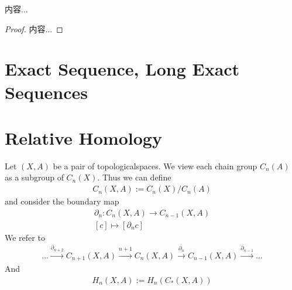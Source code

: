 \documentclass[Total.tex]{subfiles}
\begin{document}
			\begin{corollary}
				内容...
			\end{corollary}
			\begin{proof}
				内容...
			\end{proof}
		\section{Exact Sequence, Long Exact Sequences}
			
		\section{Relative Homology}
			\begin{Def}
				Let $(X,A)$ be a pair of topologicalspaces. We view each chain group $C_n(A)$ as a subgroup of $C_n(X)$. Thus we can define
				\begin{gather*}
					C_n(X,A):=C_n(X)/C_n(A)
				\end{gather*}
				and consider the boundary map
				\begin{gather*}
					\partial_n:C_n(X,A)\rightarrow C_{n-1}(X,A)\\
					[c]\mapsto [\partial_n c]
				\end{gather*}
				We refer to
				\begin{gather*}
					\dots\stackrel{\partial_{n+2}}{\rightarrow} C_{n+1}(X,A)\stackrel{n+1}{\rightarrow} C_n(X,A)\stackrel{\partial _n}{\rightarrow}C_{n-1}(X,A)\stackrel{\partial_{n-1}}{\rightarrow} \dots
				\end{gather*}
				And
				\begin{gather*}
					H_n(X,A):=H_n(C_*(X,A))
				\end{gather*}
			\end{Def}
			
\end{document}
